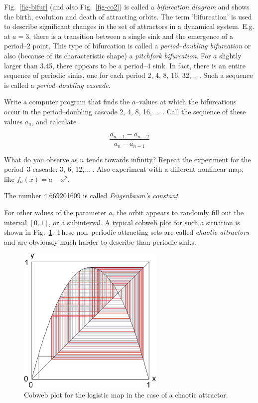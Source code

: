 Fig.~\ref{fig-bifur} (and also Fig.~\ref{fig-co2}) is called a \emph{bifurcation diagram} and shows the birth, evolution and death of attracting orbits. The term 'bifurcation' is used to describe significant changes in the set of attractors in a dynamical system. E.g. at $a=3$, there is a transition between a single sink and the emergence of a period--2 point. This type of bifurcation is called a \emph{period--doubling bifurcation} or also (because of its characteristic shape) a \emph{pitchfork bifurcation}. For $a$ slightly larger than 3.45, there appears to be a period--4 sink. In fact, there is an entire sequence of periodic sinks, one for each period 2, 4, 8, 16, 32,... . Such a sequence is called a \emph{period--doubling cascade}.

\begin{sidebar}
\begin{ex}
Write a computer program that finds the $a$--values at which the bifurcations occur in the period--doubling cascade 2, 4, 8, 16, ... . Call the sequence of these values $a_n$, and calculate

$$\frac{a_{n-1} - a_{n-2}}{a_{n} - a_{n-1}}$$

What do you observe as $n$ tends towards infinity? Repeat the experiment for the period--3 cascade: 3, 6, 12,... . Also experiment with a different nonlinear map, like $f_a(x)=a-x^2$.

The number 4.669201609 is called \emph{Feigenbaum's constant}.
\end{ex}
\end{sidebar}

For other values of the parameter $a$, the orbit appears to randomly fill out the interval $[0,1]$, or a subinterval. A typical cobweb plot for such a situation is shown in Fig.~\ref{fig-cobweb3}. These non--periodic attracting sets are called \emph{chaotic attractors} and are obviously much harder to describe than periodic sinks.

\begin{figure}
\centering
\includegraphics[width=7cm]{dynamic/figures/cobweb3}
\caption{Cobweb plot for the logistic map in the case of a chaotic attractor.}
\label{fig-cobweb3}
\end{figure} 

